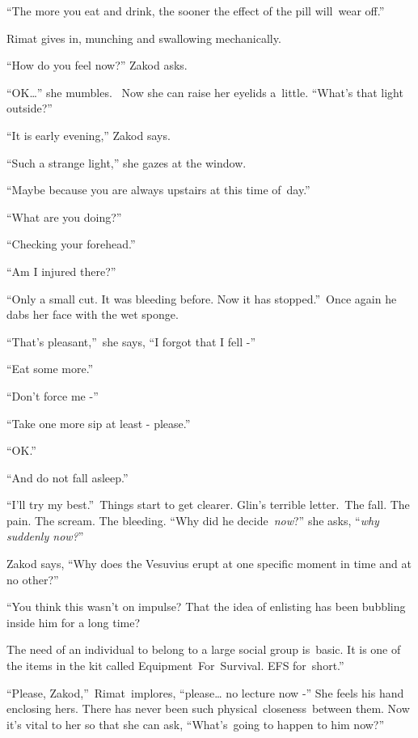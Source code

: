 \documentclass[twoside,11pt]{book}
\begin{document}
{}``The more you eat and drink, the sooner the effect of the pill will\ wear off.''

Rimat gives in, munching and swallowing mechanically.

{}``How do you feel now?'' Zakod asks. \ 

{}``OK{\dots}'' she mumbles.~ Now she can raise her eyelids a\ little. ``What{}'s that light outside?''\ 

{}``It is early evening,'' Zakod says.\ 

{}``Such a strange light,'' she gazes at the window.\ 

{}``Maybe because you are always upstairs at this time of~day.''\ 

{}``What are you doing?''\ 

{}``Checking your forehead.''\ 

{}``Am I injured there?''\ 

{}``Only a small cut. It was bleeding before. Now it has stopped.''\ Once again he dabs her face with the wet sponge. 

{}``That's pleasant,''\ she says, ``I forgot that I fell -''\ 

{}``Eat some more.{}''

{}``Don't force me -{}''\ 

{}``Take one more sip at least - please.''\ 

{}``OK.{}''\ 

{}``And do not fall asleep.''

{}``I{}'ll try my best.{}''\ Things start to get clearer. Glin{}'s terrible letter.\ The fall. The pain. The scream. The
bleeding. {}``Why did he decide\ \textit{now}?{}'' she asks, ``\textit{why suddenly now?}{}''

Zakod says, ``Why does the Vesuvius erupt at one specific moment in time and at no other?''\ 

{}``You think this wasn't on impulse? That the idea of enlisting has been bubbling inside him for a long
time?{\textquotedbl} 

{\textquotedbl}The need of an individual to belong to a large social group is\ basic. It is one of the items in the kit
called Equipment\ For\ Survival. EFS for\ short.''\ 

{}``Please, Zakod,''\ Rimat~implores, ``please{\dots} no lecture now -'' She feels his hand enclosing hers. There has
never been such physical\ closeness{\ }between them. Now it{}'s vital to her so that she can ask,
``What's\ going to happen to him now?''\ 
\end{document}
